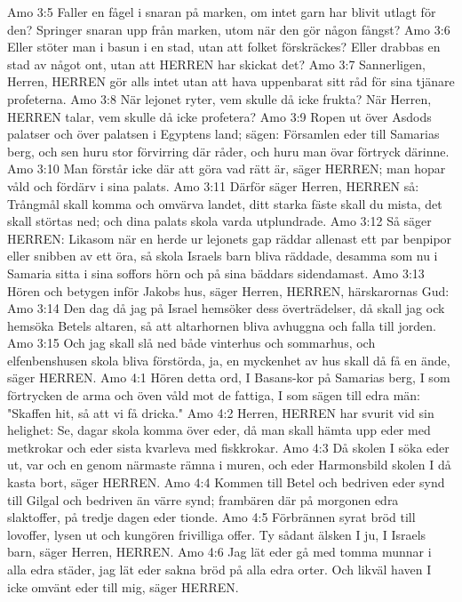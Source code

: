 Amo 3:5  Faller en fågel i snaran på marken, om intet garn har blivit utlagt för den? Springer snaran upp från marken, utom när den gör någon fångst?
Amo 3:6  Eller stöter man i basun i en stad, utan att folket förskräckes? Eller drabbas en stad av något ont, utan att HERREN har skickat det?
Amo 3:7  Sannerligen, Herren, HERREN gör alls intet utan att hava uppenbarat sitt råd för sina tjänare profeterna.
Amo 3:8  När lejonet ryter, vem skulle då icke frukta? När Herren, HERREN talar, vem skulle då icke profetera?
Amo 3:9  Ropen ut över Asdods palatser och över palatsen i Egyptens land; sägen: Församlen eder till Samarias berg, och sen huru stor förvirring där råder, och huru man övar förtryck därinne.
Amo 3:10  Man förstår icke där att göra vad rätt är, säger HERREN; man hopar våld och fördärv i sina palats.
Amo 3:11  Därför säger Herren, HERREN så: Trångmål skall komma och omvärva landet, ditt starka fäste skall du mista, det skall störtas ned; och dina palats skola varda utplundrade.
Amo 3:12  Så säger HERREN: Likasom när en herde ur lejonets gap räddar allenast ett par benpipor eller snibben av ett öra, så skola Israels barn bliva räddade, desamma som nu i Samaria sitta i sina soffors hörn och på sina bäddars sidendamast.
Amo 3:13  Hören och betygen inför Jakobs hus, säger Herren, HERREN, härskarornas Gud:
Amo 3:14  Den dag då jag på Israel hemsöker dess överträdelser, då skall jag ock hemsöka Betels altaren, så att altarhornen bliva avhuggna och falla till jorden.
Amo 3:15  Och jag skall slå ned både vinterhus och sommarhus, och elfenbenshusen skola bliva förstörda, ja, en myckenhet av hus skall då få en ände, säger HERREN.
Amo 4:1  Hören detta ord, I Basans-kor på Samarias berg, I som förtrycken de arma och öven våld mot de fattiga, I som sägen till edra män: "Skaffen hit, så att vi få dricka."
Amo 4:2  Herren, HERREN har svurit vid sin helighet: Se, dagar skola komma över eder, då man skall hämta upp eder med metkrokar och eder sista kvarleva med fiskkrokar.
Amo 4:3  Då skolen I söka eder ut, var och en genom närmaste rämna i muren, och eder Harmonsbild skolen I då kasta bort, säger HERREN.
Amo 4:4  Kommen till Betel och bedriven eder synd till Gilgal och bedriven än värre synd; frambären där på morgonen edra slaktoffer, på tredje dagen eder tionde.
Amo 4:5  Förbrännen syrat bröd till lovoffer, lysen ut och kungören frivilliga offer. Ty sådant älsken I ju, I Israels barn, säger Herren, HERREN.
Amo 4:6  Jag lät eder gå med tomma munnar i alla edra städer, jag lät eder sakna bröd på alla edra orter. Och likväl haven I icke omvänt eder till mig, säger HERREN.
